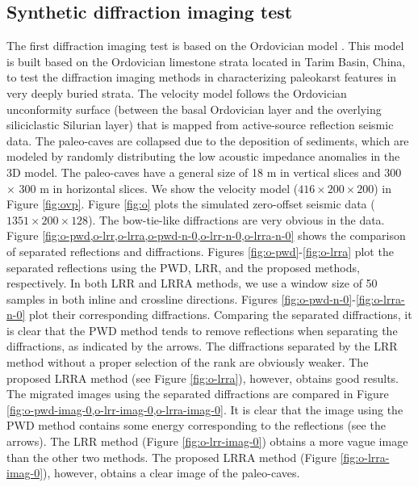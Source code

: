\subsection{Synthetic diffraction imaging test}
The first diffraction imaging test is based on the Ordovician model \cite[]{decker2015carbonate,janson2010ultra,decker2015carbonate}. This model 
is built based on the Ordovician limestone strata located in Tarim Basin, China, to test the diffraction imaging methods in characterizing paleokarst features in very deeply buried strata. The velocity model follows the Ordovician unconformity surface (between the basal Ordovician layer and the overlying siliciclastic Silurian layer) that is mapped from active-source reflection seismic data.  The paleo-caves are collapsed due to the deposition of sediments, which are modeled by randomly distributing the low acoustic impedance anomalies in the 3D model. The paleo-caves have a general size of 18 m in vertical slices and 300 $\times$ 300 m in horizontal slices. We show the velocity model ($416\times200\times 200$) in Figure \ref{fig:ovp}. Figure \ref{fig:o} plots the simulated zero-offset seismic data ($1351\times200\times 128$). The bow-tie-like diffractions are very obvious in the data. Figure \ref{fig:o-pwd,o-lrr,o-lrra,o-pwd-n-0,o-lrr-n-0,o-lrra-n-0} shows the comparison of separated reflections and diffractions. Figures \ref{fig:o-pwd}-\ref{fig:o-lrra} plot the separated reflections using the PWD, LRR, and the proposed methods, respectively. In both LRR and LRRA methods, we use a window size of 50 samples in both inline and crossline directions. Figures \ref{fig:o-pwd-n-0}-\ref{fig:o-lrra-n-0} plot their corresponding diffractions. Comparing the separated diffractions, it is clear that the PWD method tends to remove reflections when separating the diffractions, as indicated by the arrows. The diffractions separated by the LRR method without a proper selection of the rank are obviously weaker.  The proposed LRRA method (see Figure \ref{fig:o-lrra}), however, obtains good results. The migrated images using the separated diffractions are compared in Figure \ref{fig:o-pwd-imag-0,o-lrr-imag-0,o-lrra-imag-0}. It is clear that the image using the PWD method contains some energy corresponding to the reflections (see the arrows). The LRR method (Figure \ref{fig:o-lrr-imag-0}) obtains a more vague image than the other two methods. The proposed LRRA method (Figure \ref{fig:o-lrra-imag-0}), however, obtains a clear image of the paleo-caves. 






